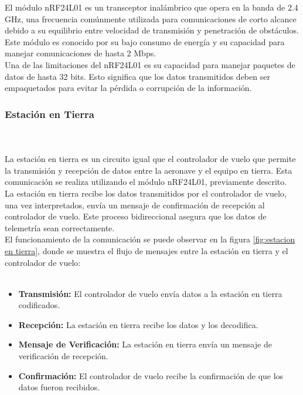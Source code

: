 El módulo nRF24L01 es un transceptor inalámbrico que opera en la banda de 2.4 GHz, una frecuencia comúnmente utilizada para comunicaciones de corto alcance debido a su equilibrio entre velocidad de transmisión y penetración de obstáculos. Este módulo es conocido por su bajo consumo de energía y su capacidad para manejar comunicaciones de hasta 2 Mbps.\\ 

Una de las limitaciones del nRF24L01 es su capacidad para manejar paquetes de datos de hasta 32 bits. Esto significa que los datos transmitidos deben ser empaquetados para evitar la pérdida o corrupción de la información.

\subsubsection{Estación en Tierra }\\ \\

La estación en tierra es un circuito igual que el controlador de vuelo que permite la transmisión y recepción de datos entre la aeronave y el equipo en tierra. Esta comunicación se realiza utilizando el módulo nRF24L01, previamente descrito. \\


La estación en tierra recibe los datos transmitidos por el controlador de vuelo, una vez interpretados, envía un mensaje de confirmación de recepción al controlador de vuelo. Este proceso bidireccional asegura que los datos de telemetría sean correctamente. \\

El funcionamiento de la comunicación se puede observar en la figura \ref{fig:estacion en tierra}, donde se muestra el flujo de mensajes entre la estación en tierra y el controlador de vuelo: \\ \\ 

\begin{itemize}
    \item \textbf{Transmisión:} El controlador de vuelo envía datos a la estación en tierra codificados.
    \item \textbf{Recepción:} La estación en tierra recibe los datos y los decodifica.
    \item \textbf{Mensaje de Verificación:} La estación en tierra envía un mensaje de verificación de recepción.
    \item \textbf{Confirmación:} El controlador de vuelo recibe la confirmación de que los datos fueron recibidos.
\end{itemize} \\ \\ 


